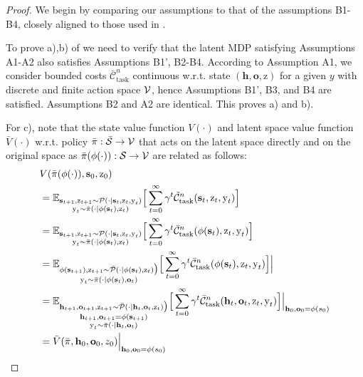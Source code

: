 \thmsauteequivalence*
\begin{proof}


We begin by comparing our assumptions to that of the assumptions B1-B4, closely aligned to those used in \citet{hernandez1992discrete,sootla2022saute}.

To prove a),b) of  we need to verify that the latent MDP satisfying Assumptions A1-A2 also satisfies Assumptions B1', B2-B4. According to Assumption A1, we consider bounded costs $\bar{\mathcal{C}}^{n}_{\text{task}}$ continuous w.r.t. state $(\mathbf{h},\mathbf{o},\text{z})$ for a given $y$ with discrete and finite action space ${\mathcal{V}}$, hence Assumptions B1', B3, and B4 are satisfied. Assumptions B2 and A2 are identical. This proves a) and b).


For c), note that the state value function $V(\cdot)$ and latent space value function $\bar{V}(\cdot)$ w.r.t. policy $\bar{\pi}:\bar{{\mathcal{S}}}\rightarrow{\mathcal{V}}$ that acts on the latent space directly and on the original space as $\bar{\pi}(\phi(\cdot)):{\mathcal{S}}\rightarrow{\mathcal{V}}$ are related as follows:
\begin{align}
     &V(\bar{\pi}(\phi(\cdot)), \mathbf{s}_0,\text{z}_0)\\&= \mathbb{E}_{\substack{\mathbf{s}_{t+1},\text{z}_{t+1}\sim {\mathcal{P}}(\cdot|\mathbf{s}_t,\text{z}_t,\text{y}_t)\\ \text{y}_{t}\sim \bar{\pi}(\cdot|\phi(\mathbf{s}_t),\text{z}_t)}}\Big[\sum_{t=0}^\infty \gamma^t \tilde{\mathcal{C}}^{n}_{\text{task}}(\mathbf{s}_t, \text{z}_{t},\text{y}_{t})\Big]\\
    &= \mathbb{E}_{\substack{\mathbf{s}_{t+1},\text{z}_{t+1}\sim {\mathcal{P}}(\cdot|\mathbf{s}_t,\text{z}_t,\text{y}_t)\\ \text{y}_{t}\sim \bar{\pi}(\cdot|\phi(\mathbf{s}_t),\text{z}_t)}}\Big[\sum_{t=0}^\infty \gamma^t \bar{\mathcal{C}}^{n}_{\text{task}}(\phi(\mathbf{s}_t), \text{z}_{t},\text{y}_{t})\Big]\\
     &=\mathbb{E}_{\substack{\phi(\mathbf{s}_{t+1}),\text{z}_{t+1}\sim \bar{{\mathcal{P}}}(\cdot|\phi(\mathbf{s}_t),\text{z}_t)\big)\\ \text{y}_{t}\sim \bar{\pi}(\cdot|\phi(\mathbf{s}_t),\mathbf{o}_t)}}\Big[\sum_{t=0}^\infty \gamma^t \bar{\mathcal{C}}^{n}_{\text{task}}(\phi(\mathbf{s}_t), \text{z}_{t},\text{y}_{t})\Big]\Big|\\
    &=\mathbb{E}_{\substack{\mathbf{h}_{t+1},\mathbf{o}_{t+1},\text{z}_{t+1}\sim\bar{{\mathcal{P}}}(\cdot|\mathbf{h}_t,\mathbf{o}_t,\text{z}_t)\big)\\\mathbf{h}_{t+1},\mathbf{o}_{t+1}=\phi(\mathbf{s}_{t+1}) \\\text{y}_{t}\sim \bar{\pi}(\cdot|\mathbf{h}_t,\mathbf{o}_t)}}\Big[\sum_{t=0}^\infty \gamma^t \bar{\mathcal{C}}^{n}_{\text{task}}(\mathbf{h}_t,\mathbf{o}_t, \text{z}_{t},\text{y}_{t})\Big]\Big|_{\mathbf{h}_0,\mathbf{o}_0=\phi(s_0)}\\
    &=  \bar{V}(\bar{\pi}, \mathbf{h}_0,\mathbf{o}_0,z_0)\Big|_{\mathbf{h}_0,\mathbf{o}_0=\phi(s_0)}
\end{align}


\end{proof}
